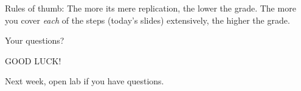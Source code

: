 \documentclass[compress]{beamer}
\begin{document}
\begin{frame}[standout]
Rules of thumb: The more its mere replication, the lower the grade. The more you cover \emph{each} of the steps (today's slides) extensively, the higher the grade.

\end{frame}





\begin{frame}[standout]
Your questions?
\end{frame}





\begin{frame}[standout]
GOOD LUCK!
\end{frame}


\begin{frame}[standout]

Next week, open lab if you have questions.

\end{frame}



\begin{frame}
\printbibliography
\end{frame}
\end{document}
